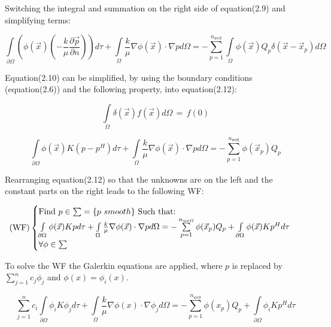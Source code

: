 \documentclass[a4paper]{report}
\begin{document}
Switching the integral and summation on the right side of equation(2.9) and simplifying terms:

\begin{equation}
	\int\limits_{\partial\Omega}(\phi(\vec{x})(-\frac{k}{\mu}\frac{\partial\vec{p}}{\partial n}))d\tau+\int\limits_{\Omega}\frac{k}{\mu}\nabla\phi(\vec{x})\cdot\nabla p d\Omega= -\sum_{p=1}^{n_{well}}\int\limits_{\Omega}\phi(\vec{x}) Q_p\delta(\vec{x}-\vec{x}_p)d\Omega
\end{equation}


Equation(2.10) can be simplified, by using the boundary conditions (equation(2.6)) and the following property, into equation(2.12): 

\begin{equation}
	\int\limits_{\Omega}\delta(\vec{x})f(\vec{x})d\Omega \, = \, f(0)	
\end{equation}



\begin{equation}
	\int\limits_{\partial\Omega}\phi(\vec{x})K(p-p^H) d\tau+\int\limits_{\Omega}\frac{k}{\mu}\nabla\phi(\vec{x})\cdot\nabla p d\Omega= -\sum_{p=1}^{n_{\text{well}}}\phi(\vec{x}_p) Q_p
\end{equation}	

Rearranging equation(2.12) so that the unknowns are on the left and the constant parts on the right leads to the following WF:
\vspace{1mm}

 \begin{equation}
 \text{(WF)}
		\begin{cases} 
			$Find $p \in \sum =\{p$ $ smooth\}$ Such that:$ \\
			\int\limits_{\partial\Omega}\phi(\vec{x})Kp d\tau+\int\limits_{\Omega}\frac{k}{\mu}\nabla\phi(\vec{x})\cdot\nabla p d\Omega= -\sum\limits_{p=1}^{n_{well}}\phi(\vec{x}_p) Q_p +\int\limits_{\partial\Omega}\phi(\vec{x})Kp^Hd\tau\\ \forall\phi \in \sum 
		\end{cases}\  
\end{equation}
\vspace{1mm}

To solve the WF the Galerkin equations are applied, where $p$ is replaced by $ \sum\limits_{j=1}^{n}c_j\phi_j $ and  $\phi(x)=\phi_i(x)$.

\begin{equation}
	\sum\limits_{j=1}^{n}c_i\int\limits_{\partial\Omega}\phi_i K\phi_j d\tau + \int\limits_{\Omega}\frac{k}{\mu}\nabla\phi(x)\cdot\nabla \phi_j d\Omega= -\sum\limits_{p=1}^{n_{well}}\phi(x_p) Q_p +\int\limits_{\partial\Omega}\phi_i Kp^Hd\tau
\end{equation}
\end{document}

